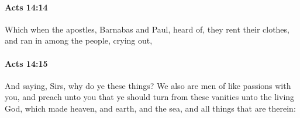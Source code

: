 		\paragraph{Acts 14:14} %
			\label{ACTS-14-14}

			Which when the apostles, Barnabas and Paul, heard of, they rent their clothes, and ran in among the people, crying out,

			\begin{framed}
			\scriptsize
				\begin{compactdesc}
					\item[SBLG] 
				\end{compactdesc}
			\end{framed}

		\paragraph{Acts 14:15} %
			\label{ACTS-14-15}

			And saying, Sirs, why do ye these things?  We also are men of like passions with you, and preach unto you that ye should turn from these vanities unto the living God, which made heaven, and earth, and the sea, and all things that are therein:

